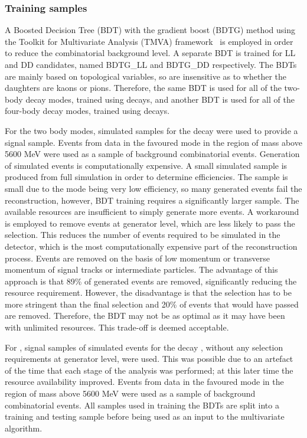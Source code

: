 \subsubsection{Training samples}

A Boosted Decision Tree (BDT) with the gradient boost (BDTG) method using the Toolkit for Multivariate Analysis (TMVA) framework~\cite{TMVA} is employed in order to reduce the combinatorial background level. A separate BDT is trained for LL and DD candidates, named BDTG\_LL and BDTG\_DD respectively. The BDTs are mainly based on topological variables, so are insensitive as to whether the \Dz daughters are kaons or pions. Therefore, the same BDT is used for all of the two-body \Dz decay modes, trained using \kpi decays, and another BDT is used for all of the four-body \Dz decay modes, trained using \kpipipi decays. 

For the two body modes, simulated samples for the decay \kpi were used to provide a signal sample. Events from data in the favoured \kpi mode in the region of \Bm mass above 5600 MeV were used as a sample of background combinatorial events. Generation of simulated events is computationally expensive. A small simulated sample is produced from full \lhcb simulation in order to determine efficiencies. The sample is small due to the mode being very low efficiency, so many generated events fail the reconstruction, however, BDT training requires a significantly larger sample. The available resources are insufficient to simply generate more events. A workaround is employed to remove events at generator level, which are less likely to pass the selection. This reduces the number of events required to be simulated in the \lhcb detector, which is the most computationally expensive part of the reconstruction process. Events are removed on the basis of low momentum or transverse momentum of signal tracks or intermediate particles. The advantage of this approach is that 89\% of generated events are removed, significantly reducing the resource requirement. However, the disadvantage is that the selection has to be more stringent than the final selection and 20\% of events that would have passed are removed. Therefore, the BDT may not be as optimal as it may have been with unlimited resources. This trade-off is deemed acceptable.

For \kpipipi, signal samples of simulated events for the decay \kpipipi, without any selection requirements at generator level, were used. This was possible due to an artefact of the time that each stage of the analysis was performed; at this later time the resource availability improved. Events from data in the favoured \kpipipi mode in the region of \Bm mass above 5600 MeV were used as a sample of background combinatorial events. All samples used in training the BDTs are split into a training and testing sample before being used as an input to the multivariate algorithm.

